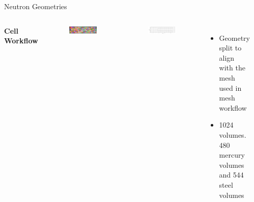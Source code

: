 \documentclass{beamer}
\begin{document}
\begin{frame}{Neutron Geometries}
\begin{columns}[T]
	\textbf{Cell Workflow}
                \begin{figure}
                        \centering
                        \includegraphics[scale=0.12]{figs/box_target_split_trelis.png}
                \end{figure}
                \begin{figure}
                        \centering
                        \includegraphics[scale=0.11]{figs/box_target_split_nograveyard.png}
                \end{figure}
	\begin{itemize}
		\item{Geometry split to align with the mesh used in mesh workflow}
		\item{1024 volumes. 480 mercury volumes and 544 steel volumes}
	\end{itemize}

        \rule{.1mm}{.7\textheight}


\end{columns}
\end{frame}
\end{document}

